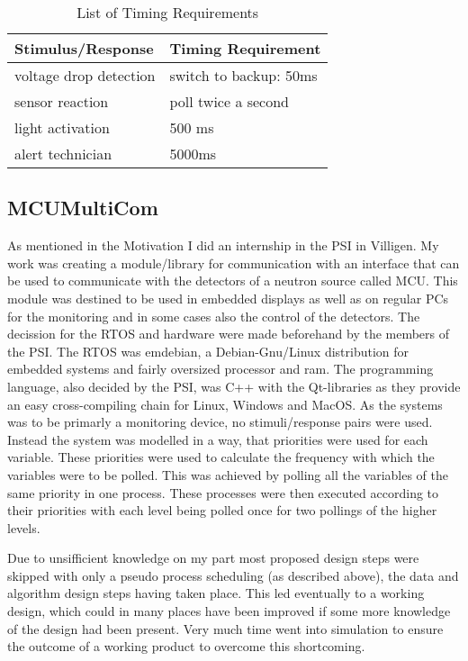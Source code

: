 \documentclass[10pt,a4paper,titlepage,draft]{article} %
\begin{document}
\begin{table}[h]
\begin{tabular}{|p{4cm}|p{7.2cm}|}
\hline %
\rowcolor{gray} Stimulus/Response & Timing Requirement \\
\hline %
voltage drop detection & switch to backup: 50ms \\
\hline %
sensor reaction & poll twice a second \\
\hline %
light activation & 500 ms \\
\hline %
alert technician & 5000ms \\
\hline %
\end{tabular}
\label{tab:radTime}
\caption{List of Timing Requirements}
\end{table}

\subsection{MCUMultiCom}
As mentioned in the Motivation I did an internship in the PSI in Villigen.
My work was creating a module/library for communication with an interface that can be used to communicate with the detectors of a neutron source called MCU.
This module was destined to be used in embedded displays as well as on regular PCs for the monitoring and in some cases also the control of the detectors.
The decission for the RTOS and hardware were made beforehand by the members of the PSI.
The RTOS was emdebian, a Debian-Gnu/Linux distribution for embedded systems and fairly oversized processor and ram.
The programming language, also decided by the PSI, was C++ with the Qt-libraries as they provide an easy cross-compiling chain for Linux, Windows and MacOS.
As the systems was to be primarly a monitoring device, no stimuli/response pairs were used.
Instead the system was modelled in a way, that priorities were used for each variable.
These priorities were used to calculate the frequency with which the variables were to be polled.
This was achieved by polling all the variables of the same priority in one process.
These processes were then executed according to their priorities with each level being polled once for two pollings of the higher levels.

Due to unsifficient knowledge on my part most proposed design steps were skipped with only a pseudo process scheduling (as described above), the data and algorithm design steps having taken place.
This led eventually to a working design, which could in many places have been improved if some more knowledge of the design had been present.
Very much time went into simulation to ensure the outcome of a working product to overcome this shortcoming.
\end{document}
